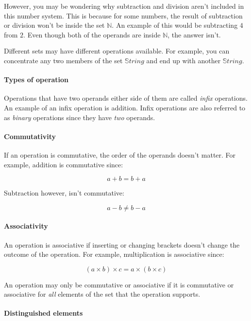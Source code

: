 \documentclass{article}
\begin{document}
However, you may be wondering why subtraction and division aren't included in this number system. This is because for some numbers, the result of subtraction or division won't be inside the set $\mathbb{N}$. An example of this would be subtracting $4$ from $2$. Even though both of the operands are inside $\mathbb{N}$, the answer isn't.

Different sets may have different operations available. For example, you can concentrate any two members of the set $\mathbb{S}tring$ and end up with another $\mathbb{S}tring$.

\paragraph{Types of operation}

Operations that have two operands either side of them are called {\it infix} operations. An example of an infix operation is addition. Infix operations are also referred to as {\it binary} operations since they have {\it two} operands.

\paragraph{Commutativity}

If an operation is commutative, the order of the operands doesn't matter. For example, addition is commutative since:

\[
	a + b = b + a
\]

Subtraction however, isn't commutative:

\[
	a - b \neq b - a
\]

\paragraph{Associativity}

An operation is associative if inserting or changing brackets doesn't change the outcome of the operation. For example, multiplication is associative since:

\[
	(a \times b) \times c = a \times (b \times c)
\]

An operation may only be commutative or associative if it is commutative or associative for {\it all} elements of the set that the operation supports.

\paragraph{Distinguished elements}
\end{document}
